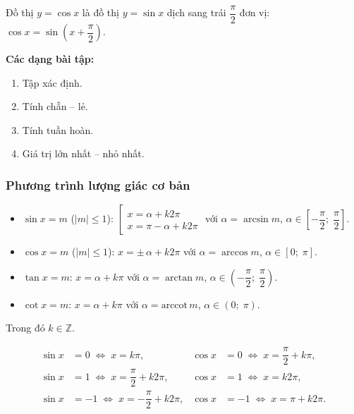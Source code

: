 \documentclass[12pt,a4paper]{article}
\begin{document}
\begin{luuy}
  Đồ thị $y = \cos x$ là đồ thị $y = \sin x$ dịch sang trái $\dfrac{\pi}{2}$ đơn vị:
  $\cos x = \sin\!\left(x + \dfrac{\pi}{2}\right)$.
\end{luuy}

\medskip\noindent\textbf{Các dạng bài tập:}
\begin{enumerate}[label=\textbf{Dạng \arabic*:}, leftmargin=*, align=left]
  \item Tập xác định.
  \item Tính chẵn -- lẻ.
  \item Tính tuần hoàn.
  \item Giá trị lớn nhất -- nhỏ nhất.
\end{enumerate}

\subsubsection{Phương trình lượng giác cơ bản}

\begin{congthuc}
  \begin{itemize}
    \item $\sin x = m$ \;($|m| \le 1$):
      \;$\left[\begin{array}{l}
        x = \alpha + k2\pi \\
        x = \pi - \alpha + k2\pi
      \end{array}\right.$
      với $\alpha = \arcsin m$, \;$\alpha \in \left[-\dfrac{\pi}{2};\;\dfrac{\pi}{2}\right]$.

    \item $\cos x = m$ \;($|m| \le 1$):
      \;$x = \pm\,\alpha + k2\pi$
      \;với $\alpha = \arccos m$, \;$\alpha \in [0;\;\pi]$.

    \item $\tan x = m$:
      \;$x = \alpha + k\pi$
      \;với $\alpha = \arctan m$, \;$\alpha \in \left(-\dfrac{\pi}{2};\;\dfrac{\pi}{2}\right)$.

    \item $\cot x = m$:
      \;$x = \alpha + k\pi$
      \;với $\alpha = \text{arccot}\, m$, \;$\alpha \in (0;\;\pi)$.
  \end{itemize}
  Trong đó $k \in \mathbb{Z}$.
\end{congthuc}

\begin{congthuc}[title={Các trường hợp đặc biệt}]
  \begin{align*}
    \sin x &= 0 \;\Leftrightarrow\; x = k\pi, &
    \cos x &= 0 \;\Leftrightarrow\; x = \dfrac{\pi}{2} + k\pi, \\
    \sin x &= 1 \;\Leftrightarrow\; x = \dfrac{\pi}{2} + k2\pi, &
    \cos x &= 1 \;\Leftrightarrow\; x = k2\pi, \\
    \sin x &= -1 \;\Leftrightarrow\; x = -\dfrac{\pi}{2} + k2\pi, &
    \cos x &= -1 \;\Leftrightarrow\; x = \pi + k2\pi.
  \end{align*}
\end{congthuc}
\end{document}
